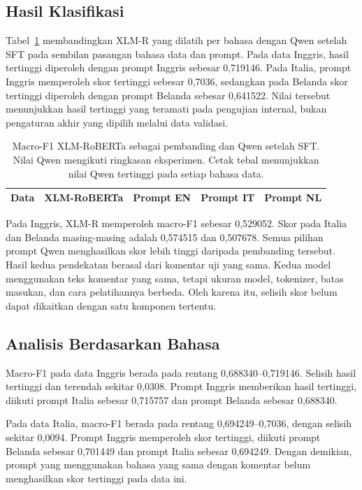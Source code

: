 \documentclass[11pt]{article}
\begin{document}
\subsection{Hasil Klasifikasi}
Tabel~\ref{tab:main} membandingkan XLM-R yang dilatih per bahasa dengan Qwen setelah SFT pada sembilan pasangan bahasa data dan prompt. Pada data Inggris, hasil tertinggi diperoleh dengan prompt Inggris sebesar 0,719146. Pada Italia, prompt Inggris memperoleh skor tertinggi sebesar 0,7036, sedangkan pada Belanda skor tertinggi diperoleh dengan prompt Belanda sebesar 0,641522. Nilai tersebut menunjukkan hasil tertinggi yang teramati pada pengujian internal, bukan pengaturan akhir yang dipilih melalui data validasi.

\begin{table}[t]
\centering
\small
\setlength{\tabcolsep}{3pt}
\begin{tabular}{lrrrr}
\toprule
Data & XLM-RoBERTa & Prompt EN & Prompt IT & Prompt NL \\
\midrule

\end{tabular}
\caption{Macro-F1 XLM-RoBERTa sebagai pembanding dan Qwen setelah SFT. Nilai Qwen mengikuti ringkasan eksperimen. Cetak tebal menunjukkan nilai Qwen tertinggi pada setiap bahasa data.}
\label{tab:main}
\end{table}

Pada Inggris, XLM-R memperoleh macro-F1 sebesar 0,529052. Skor pada Italia dan Belanda masing-masing adalah 0,574515 dan 0,507678. Semua pilihan prompt Qwen menghasilkan skor lebih tinggi daripada pembanding tersebut. Hasil kedua pendekatan berasal dari komentar uji yang sama. Kedua model menggunakan teks komentar yang sama, tetapi ukuran model, tokenizer, batas masukan, dan cara pelatihannya berbeda. Oleh karena itu, selisih skor belum dapat dikaitkan dengan satu komponen tertentu.

\subsection{Analisis Berdasarkan Bahasa}
Macro-F1 pada data Inggris berada pada rentang 0,688340--0,719146. Selisih hasil tertinggi dan terendah sekitar 0,0308. Prompt Inggris memberikan hasil tertinggi, diikuti prompt Italia sebesar 0,715757 dan prompt Belanda sebesar 0,688340.

Pada data Italia, macro-F1 berada pada rentang 0,694249--0,7036, dengan selisih sekitar 0,0094. Prompt Inggris memperoleh skor tertinggi, diikuti prompt Belanda sebesar 0,701449 dan prompt Italia sebesar 0,694249. Dengan demikian, prompt yang menggunakan bahasa yang sama dengan komentar belum menghasilkan skor tertinggi pada data ini.
\end{document}
